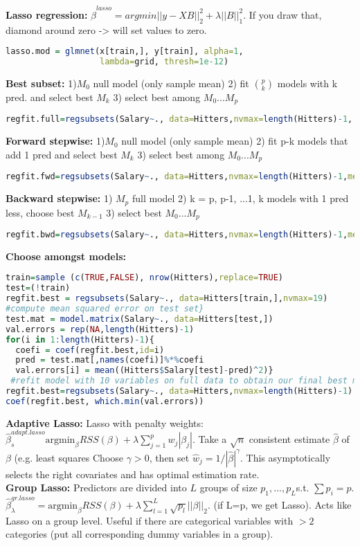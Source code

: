 \textbf{Lasso regression: }
$\hat\beta^{lasso} = argmin ||y-XB||_2^2+ \lambda||B||_1^2$. If you draw that, diamond around zero -> will set values to zero. 
\begin{lstlisting}[language=R]
lasso.mod = glmnet(x[train,], y[train], alpha=1, 
                   lambda=grid, thresh=1e-12)
\end{lstlisting}
\textbf{Best subset: }
1)$M_0$ null model (only sample mean)
2) fit $p \choose k$ models with k pred. and select best $M_k$
3) select best among $M_0 ... M_p$
\begin{lstlisting}[language=R]
regfit.full=regsubsets(Salary~., data=Hitters,nvmax=length(Hitters)-1, method = "exhaustive")
\end{lstlisting}

\textbf{Forward stepwise: }
1)$M_0$ null model (only sample mean)
2) fit p-k models that add 1 pred and select best $M_k$
3) select best among $M_0 ... M_p$
\begin{lstlisting}[language=R]
regfit.fwd=regsubsets(Salary~., data=Hitters,nvmax=length(Hitters)-1,method="forward")
\end{lstlisting}
\textbf{Backward stepwise: }
1) $M_p$ full model
2) k = p, p-1, ...1,
k models with 1 pred less, choose best $M_{k-1}$
3) select best $M_0 ... M_p$
\begin{lstlisting}[language=R]
regfit.bwd=regsubsets(Salary~., data=Hitters,nvmax=length(Hitters)-1,method="backward")
\end{lstlisting}
\textbf{Choose amongst models: }
\begin{lstlisting}[language=R]
train=sample (c(TRUE,FALSE), nrow(Hitters),replace=TRUE)
test=(!train)
regfit.best = regsubsets(Salary~., data=Hitters[train,],nvmax=19)
#compute mean squared error on test set}
test.mat = model.matrix(Salary~., data=Hitters[test,])
val.errors = rep(NA,length(Hitters)-1)
for(i in 1:length(Hitters)-1){
  coefi = coef(regfit.best,id=i)
  pred = test.mat[,names(coefi)]%*%coefi
  val.errors[i] = mean((Hitters$Salary[test]-pred)^2)}
 #refit model with 10 variables on full data to obtain our final best model
regfit.best=regsubsets(Salary~., data=Hitters,nvmax=length(Hitters)-1)
coef(regfit.best, which.min(val.errors))
\end{lstlisting}

\textbf{Adaptive Lasso:} Lasso with penalty weights: $\hat\beta_s^{adapt.lasso}\text{argmin}_\beta RSS(\beta) + \lambda \sum_{j=1}^p w_j |\beta_j|$. Take a $\sqrt{n}$ consistent estimate $\hat\beta$ of $\beta$ (e.g. least squares Choose $\gamma>0$, then set $\hat w_j = {1}/{|\hat\beta|^\gamma}$. This asymptotically selects the right covariates and has optimal estimation rate.\\
\textbf{Group Lasso:} Predictors are divided into $L$ groups of size $p_1, ..., p_L$s.t. $\sum p_i = p$. $\hat\beta_\lambda^{gr.lasso}=\text{argmin}_\beta RSS(\beta)+\lambda \sum_{l=1}^L \sqrt{p_l} ||\beta||_2$. (if L=p, we get Lasso). Acts like Lasso on a group level. Useful if there are categorical variables with $>2$ categories (put all corresponding dummy variables in a group).